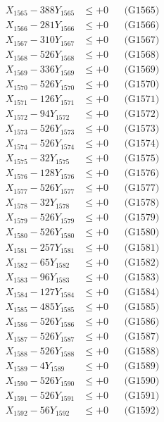 \documentclass[a4paper,10pt]{article}
\begin{document}
{\begin{align}
X_{1565} - 388Y_{1565} &\leq +0 && \text{(G1565)} \\
X_{1566} - 281Y_{1566} &\leq +0 && \text{(G1566)} \\
X_{1567} - 310Y_{1567} &\leq +0 && \text{(G1567)} \\
X_{1568} - 526Y_{1568} &\leq +0 && \text{(G1568)} \\
X_{1569} - 336Y_{1569} &\leq +0 && \text{(G1569)} \\
X_{1570} - 526Y_{1570} &\leq +0 && \text{(G1570)} \\
\allowbreak
X_{1571} - 126Y_{1571} &\leq +0 && \text{(G1571)} \\
X_{1572} - 94Y_{1572} &\leq +0 && \text{(G1572)} \\
X_{1573} - 526Y_{1573} &\leq +0 && \text{(G1573)} \\
X_{1574} - 526Y_{1574} &\leq +0 && \text{(G1574)} \\
X_{1575} - 32Y_{1575} &\leq +0 && \text{(G1575)} \\
X_{1576} - 128Y_{1576} &\leq +0 && \text{(G1576)} \\
X_{1577} - 526Y_{1577} &\leq +0 && \text{(G1577)} \\
X_{1578} - 32Y_{1578} &\leq +0 && \text{(G1578)} \\
X_{1579} - 526Y_{1579} &\leq +0 && \text{(G1579)} \\
X_{1580} - 526Y_{1580} &\leq +0 && \text{(G1580)} \\
\allowbreak
X_{1581} - 257Y_{1581} &\leq +0 && \text{(G1581)} \\
X_{1582} - 65Y_{1582} &\leq +0 && \text{(G1582)} \\
X_{1583} - 96Y_{1583} &\leq +0 && \text{(G1583)} \\
X_{1584} - 127Y_{1584} &\leq +0 && \text{(G1584)} \\
X_{1585} - 485Y_{1585} &\leq +0 && \text{(G1585)} \\
X_{1586} - 526Y_{1586} &\leq +0 && \text{(G1586)} \\
X_{1587} - 526Y_{1587} &\leq +0 && \text{(G1587)} \\
X_{1588} - 526Y_{1588} &\leq +0 && \text{(G1588)} \\
X_{1589} - 4Y_{1589} &\leq +0 && \text{(G1589)} \\
X_{1590} - 526Y_{1590} &\leq +0 && \text{(G1590)} \\
\allowbreak
X_{1591} - 526Y_{1591} &\leq +0 && \text{(G1591)} \\
X_{1592} - 56Y_{1592} &\leq +0 && \text{(G1592)} \\

\end{align}}
\end{document}
